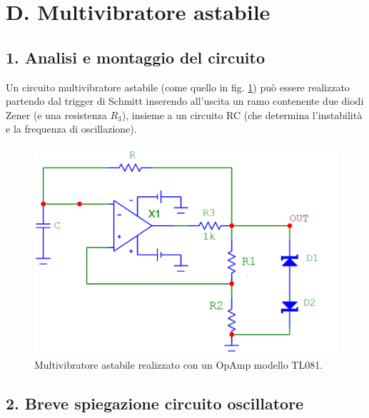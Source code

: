 \documentclass[10pt,a4paper]{article}
\begin{document}
\section*{D. Multivibratore astabile}
\subsection*{1. Analisi e montaggio del circuito}

Un circuito multivibratore astabile (come quello in fig. \ref{circuito4}) può essere realizzato partendo dal trigger di Schmitt inserendo all'uscita un ramo contenente due diodi Zener (e una resistenza $R_3$), insieme a un circuito RC (che determina l'instabilità e la frequenza di oscillazione).\\

\begin{figure}[htb!]
\centering
\includegraphics[scale=0.5]{multivibratoreAstabile.png}
\caption{Multivibratore astabile realizzato con un OpAmp modello TL081.\label{circuito4}}
\end{figure}

\subsection*{2. Breve spiegazione circuito oscillatore}
\end{document}
